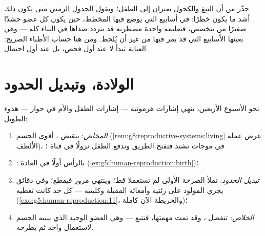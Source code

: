 \begin{example}\label{ex:g8:from-egg-to-birth:earlycare}
حذّر  من أن التبغ
والكحول يعبران إلى الطفل؛ ويقول الجدول الزمني متى يكون
ذلك أشد ما يكون خطرًا: في أسابيع  التي يوضع فيها
المخطط، حين يكون كل عضو حشدًا صغيرًا من  تتخصص،
فتعليمة واحدة مضطربة قد يتردد صداها في البناء كله ---
وهي بعينها الأسابيع التي قد يمر فيها  من غير أن
يُلحظ. ومن هنا حساب الأطباء الصريح: العناية تبدأ لا عند
أول فحص، بل عند أول احتمال.
\end{example}

\section{الولادة، وتبديل الحدود}

\begin{proposition}\label{prop:g8:from-egg-to-birth:birth}
نحو الأسبوع الأربعين، تنهي إشارات هرمونية --- إشارات
الطفل والأم في حوار --- هدوء  الطويل:
\begin{enumerate}
  \item \emph{المخاض}: ينقبض ، أقوى  الجسم
        (\cref{rem:g8:reproductive-systems:living} عرض
        عمله الألطف)، في موجات تشتد فتفتح الطريق وتدفع
        الطفل نزولًا في قناة ؛
  \item \emph{}: بالرأس أولًا في العادة
        (\cref{ex:g5:human-reproduction:birth})؛
  \item \emph{تبديل الحدود}: تملأ الصرخة الأولى  لم
        تستعملا قط؛ وينتهي مرور  فيقطع؛ وفي
        دقائق يجري المولود على رئتيه وأمعائه المقبلة
        وكليتيه --- كل حد كانت  تغطيه
        (\cref{exo:g5:human-reproduction:11}، والخريطة
        الآن كاملة)؛
  \item \emph{الخلاص}: تنفصل ، وقد تمت مهمتها،
        فتتبع --- وهي العضو الوحيد الذي يبنيه الجسم
        لاستعمال واحد ثم يطرحه.
\end{enumerate}
\end{proposition}
\admitted

